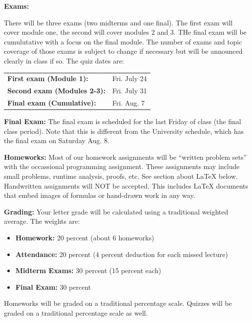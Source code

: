 \documentclass[12pt]{article}
\begin{document}
\textbf{Exams:} 

There will be three exams (two midterms and one final). The first exam will cover module one, the second will cover modules 2 and 3. THe final exam will be cumulutative with a focus on the final module. The number of exams and topic coverage of those exams is subject to change if necessary but will be announced clearly in class if so. The quiz dates are:

\begin{tabular}{ll}
\textbf{First exam (Module 1):} & Fri. July 24 \\
\textbf{Second exam (Modules 2-3):} & Fri. July 31 \\
\textbf{Final exam (Cumulative):} & Fri. Aug. 7 \\
\end{tabular}

\textbf{Final Exam:} The final exam is scheduled for the last Friday of class (the final class period). Note that this is different from the University schedule, which has the final exam on Saturday Aug. 8.

\textbf{Homeworks:} Most of our homework assignments will be ``written problem sets'' with the occassional programming assignment. These assignments may include small problems, runtime analysis, proofs, etc.   See section about \LaTeX{} below. Handwritten assignments will NOT be accepted. This includes \LaTeX{} documents that embed images of formulas or hand-drawn work in any way.

\textbf{Grading:} Your letter grade will be calculated using a traditional weighted average. The weights are:

\begin{itemize}
\item \textbf{Homework:} 20 percent (about 6 homeworks)
\item \textbf{Attendance:} 20 percent (4 percent deduction for each missed lecture)
\item \textbf{Midterm Exams:} 30 percent (15 percent each)
\item \textbf{Final Exam:} 30 percent
\end{itemize}

Homeworks will be graded on a traditional percentage scale. Quizzes will be graded on a traditional percentage scale as well.
\end{document}
